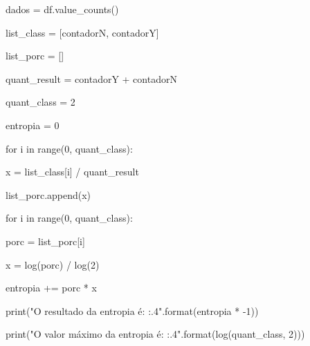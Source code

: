 \documentclass{article}
\begin{document}
dados = df.value\_counts() \par

list\_class = [contadorN, contadorY] \par
list\_porc = []\\ \par

quant\_result = contadorY + contadorN \par
quant\_class = 2\par
entropia = 0 \\ \par

for i in range(0, quant\_class):\par
    \hspace{0.5cm}x = list\_class[i] / quant\_result \par
    \hspace{0.5cm}list\_porc.append(x)\\ \par

for i in range(0, quant\_class):\par
    \hspace{0.5cm}porc = list\_porc[i]\par
    \hspace{0.5cm}x = log(porc) / log(2) \par
    \hspace{0.5cm}entropia += porc * x \par

print("O resultado da entropia é: {:.4}".format(entropia * -1)) \par
print("O valor máximo da entropia é: {:.4}".format(log(quant\_class, 2)))
\end{document}
